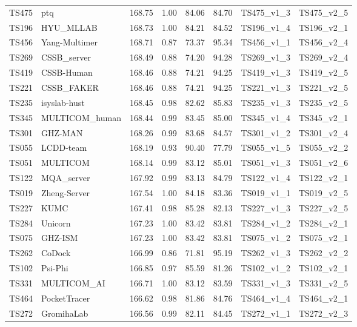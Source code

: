 \begin{longtable}{llllllll}
TS475 & ptq & 168.75 & 1.00 & 84.06 & 84.70 & TS475\_v1\_3 & TS475\_v2\_5 \\ 
TS196 & HYU\_MLLAB & 168.73 & 1.00 & 84.21 & 84.52 & TS196\_v1\_4 & TS196\_v2\_1 \\ 
TS456 & Yang-Multimer & 168.71 & 0.87 & 73.37 & 95.34 & TS456\_v1\_1 & TS456\_v2\_4 \\ 
TS269 & CSSB\_server & 168.49 & 0.88 & 74.20 & 94.28 & TS269\_v1\_3 & TS269\_v2\_4 \\ 
TS419 & CSSB-Human & 168.46 & 0.88 & 74.21 & 94.25 & TS419\_v1\_3 & TS419\_v2\_5 \\ 
TS221 & CSSB\_FAKER & 168.46 & 0.88 & 74.21 & 94.25 & TS221\_v1\_3 & TS221\_v2\_5 \\ 
TS235 & isyslab-hust & 168.45 & 0.98 & 82.62 & 85.83 & TS235\_v1\_3 & TS235\_v2\_5 \\ 
TS345 & MULTICOM\_human & 168.44 & 0.99 & 83.45 & 85.00 & TS345\_v1\_4 & TS345\_v2\_1 \\ 
TS301 & GHZ-MAN & 168.26 & 0.99 & 83.68 & 84.57 & TS301\_v1\_2 & TS301\_v2\_4 \\ 
TS055 & LCDD-team & 168.19 & 0.93 & 90.40 & 77.79 & TS055\_v1\_5 & TS055\_v2\_2 \\ 
TS051 & MULTICOM & 168.14 & 0.99 & 83.12 & 85.01 & TS051\_v1\_3 & TS051\_v2\_6 \\ 
TS122 & MQA\_server & 167.92 & 0.99 & 83.13 & 84.79 & TS122\_v1\_4 & TS122\_v2\_1 \\ 
TS019 & Zheng-Server & 167.54 & 1.00 & 84.18 & 83.36 & TS019\_v1\_1 & TS019\_v2\_5 \\ 
TS227 & KUMC & 167.41 & 0.98 & 85.28 & 82.13 & TS227\_v1\_3 & TS227\_v2\_5 \\ 
TS284 & Unicorn & 167.23 & 1.00 & 83.42 & 83.81 & TS284\_v1\_2 & TS284\_v2\_1 \\ 
TS075 & GHZ-ISM & 167.23 & 1.00 & 83.42 & 83.81 & TS075\_v1\_2 & TS075\_v2\_1 \\ 
TS262 & CoDock & 166.99 & 0.86 & 71.81 & 95.19 & TS262\_v1\_3 & TS262\_v2\_2 \\ 
TS102 & Psi-Phi & 166.85 & 0.97 & 85.59 & 81.26 & TS102\_v1\_2 & TS102\_v2\_1 \\ 
TS331 & MULTICOM\_AI & 166.71 & 1.00 & 83.12 & 83.59 & TS331\_v1\_3 & TS331\_v2\_5 \\ 
TS464 & PocketTracer & 166.62 & 0.98 & 81.86 & 84.76 & TS464\_v1\_4 & TS464\_v2\_1 \\ 
TS272 & GromihaLab & 166.56 & 0.99 & 82.11 & 84.45 & TS272\_v1\_1 & TS272\_v2\_3 \\ 

\end{longtable}
